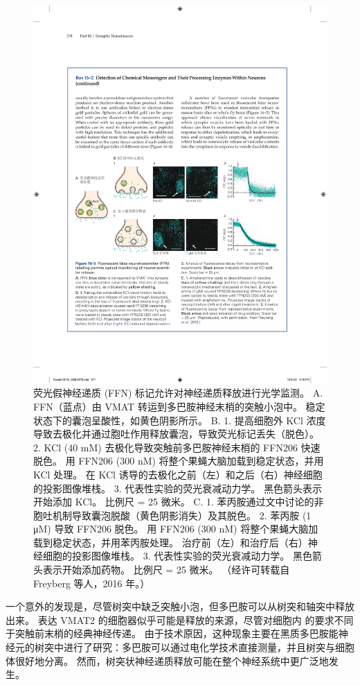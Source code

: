 \begin{figure}[htbp]
	\centering
	\includegraphics[width=0.85\linewidth]{chap16/fig_16_5}
	\caption{荧光假神经递质 (FFN) 标记允许对神经递质释放进行光学监测。 A. FFN（蓝点）由 VMAT 转运到多巴胺神经末梢的突触小泡中。 稳定状态下的囊泡呈酸性，如黄色阴影所示。 B. 1. 提高细胞外 KCl 浓度导致去极化并通过胞吐作用释放囊泡，导致荧光标记丢失（脱色）。 2. KCl (40 mM) 去极化导致突触前多巴胺神经末梢的 FFN206 快速脱色。 用 FFN206 (300 nM) 将整个果蝇大脑加载到稳定状态，并用 KCl 处理。 在 KCl 诱导的去极化之前（左）和之后（右）神经细胞的投影图像堆栈。 3. 代表性实验的荧光衰减动力学。 黑色箭头表示开始添加 KCl。 比例尺 = 25 微米。 C. 1. 苯丙胺通过文中讨论的非胞吐机制导致囊泡脱酸（黄色阴影消失）及其脱色。 2. 苯丙胺 (1 μM) 导致 FFN206 脱色。 用 FFN206 (300 nM) 将整个果蝇大脑加载到稳定状态，并用苯丙胺处理。 治疗前（左）和治疗后（右）神经细胞的投影图像堆栈。 3. 代表性实验的荧光衰减动力学。 黑色箭头表示开始添加药物。 比例尺 = 25 微米。 （经许可转载自 Freyberg 等人，2016 年。）}
	\label{fig:16_5}
\end{figure}


一个意外的发现是，尽管树突中缺乏突触小泡，但多巴胺可以从树突和轴突中释放出来。
表达 VMAT2 的细胞器似乎可能是释放的来源，尽管对细胞内  的要求不同于突触前末梢的经典神经传递。
由于技术原因，这种现象主要在黑质多巴胺能神经元的树突中进行了研究：多巴胺可以通过电化学技术直接测量，并且树突与细胞体很好地分离。
然而，树突状神经递质释放可能在整个神经系统中更广泛地发生。



